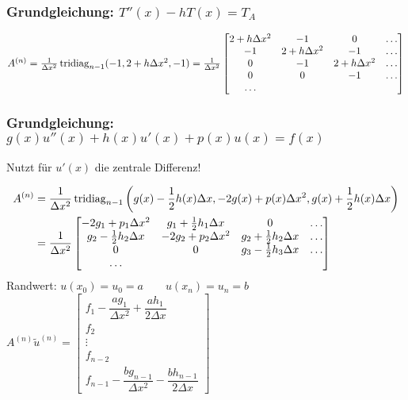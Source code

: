 \subsubsection{Grundgleichung: $T''(x) -  h T(x) = T_A$}
$A^{(n)}= \frac{1}{\Delta x^2} \operatorname{tridiag}_{n-1}
  (-1,2+h\Delta x^2,-1) = \frac{1}{\Delta x^2}
  \begin{bmatrix}
    2+h\Delta x^2 & -1            & 0             & \ldots \\
    -1            & 2+h\Delta x^2 & -1            & \ldots \\
    0             & -1            & 2+h\Delta x^2 & \ldots \\
    0             & 0             & -1            & \ldots \\
    \ldots
  \end{bmatrix} $\\

\subsubsection{Grundgleichung: $g(x)u''(x) + h(x)u'(x) + p(x)u(x)=f(x)$}
\renewcommand{\arraystretch}{1.5}
Nutzt für $u'(x)$ die zentrale Differenz!

\vspace{-12pt}
\begin{align*}
  A^{(n)} & = \frac{1}{\Delta x^2} \operatorname{tridiag}_{n-1}\left(g(x)-\frac{1}{2}h(x)\Delta x, -2g(x) + p(x)\Delta x^2, g(x)+\frac{1}{2}h(x)\Delta x\right) \\
          & = \dfrac{1}{\Delta x^2}
  \begin{bmatrix}
    -2g_1 + p_1\Delta x^2      & g_1+\frac{1}{2}h_1\Delta x & 0                          & \ldots \\
    g_2-\frac{1}{2}h_2\Delta x & -2g_2 + p_2\Delta x^2      & g_2+\frac{1}{2}h_2\Delta x & \ldots \\
    0                          & 0                          & g_3-\frac{1}{2}h_3\Delta x & \ldots \\
    \ldots                                                                                        \\
  \end{bmatrix}
\end{align*}
Randwert: $u(x_0)= u_0 = a \qquad u(x_n)= u_n =b $ \qquad
$A^{(n)}\tilde{u}^{(n)} =\begin{bmatrix}
    f_1 - \dfrac{a g_1}{\Delta x^2} + \dfrac{a h_1}{2\Delta x} \\
    f_2                                                        \\
    \vdots                                                     \\
    f_{n-2}                                                    \\
    f_{n-1} - \dfrac{b g_{n-1}}{\Delta x^2} - \dfrac{b h_{n-1}}{2\Delta x}
  \end{bmatrix} $\\
\renewcommand{\arraystretch}{1.0}


